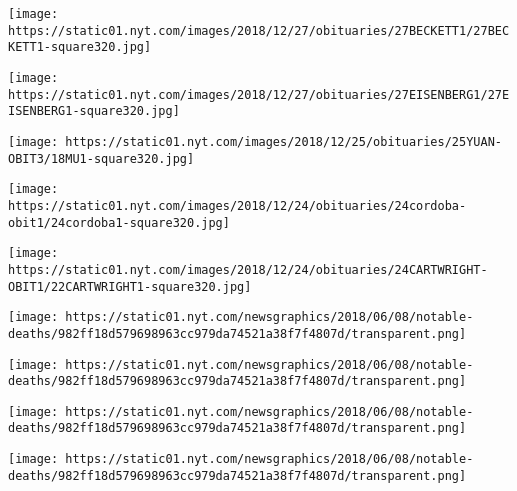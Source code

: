 \href{https://www.nytimes.com/2018/12/26/obituaries/sister-wendy-beckett-dead.html}{}

\texttt{[image: https://static01.nyt.com/images/2018/12/27/obituaries/27BECKETT1/27BECKETT1-square320.jpg]}

\href{https://www.nytimes.com/2018/12/26/obituaries/larry-eisenberg-dead.html}{}

\texttt{[image: https://static01.nyt.com/images/2018/12/27/obituaries/27EISENBERG1/27EISENBERG1-square320.jpg]}

\href{https://www.nytimes.com/2018/12/24/obituaries/yuan-mu-dead.html}{}

\texttt{[image: https://static01.nyt.com/images/2018/12/25/obituaries/25YUAN-OBIT3/18MU1-square320.jpg]}

\href{https://www.nytimes.com/2018/12/23/obituaries/roberto-suazo-cordova-dies-at-91.html}{}

\texttt{[image: https://static01.nyt.com/images/2018/12/24/obituaries/24cordoba-obit1/24cordoba1-square320.jpg]}

\href{https://www.nytimes.com/2018/12/23/obituaries/justin-cartwright-dies-at-75.html}{}

\texttt{[image: https://static01.nyt.com/images/2018/12/24/obituaries/24CARTWRIGHT-OBIT1/22CARTWRIGHT1-square320.jpg]}

\href{https://www.nytimes.com/2018/12/22/obituaries/audrey-geisel-dead.html}{}

\texttt{[image: https://static01.nyt.com/newsgraphics/2018/06/08/notable-deaths/982ff18d579698963cc979da74521a38f7f4807d/transparent.png]}

\href{https://www.nytimes.com/2018/12/21/obituaries/mel-hutchins-dead.html}{}

\texttt{[image: https://static01.nyt.com/newsgraphics/2018/06/08/notable-deaths/982ff18d579698963cc979da74521a38f7f4807d/transparent.png]}

\href{https://www.nytimes.com/2018/12/20/obituaries/raven-wilkinson-dead.html}{}

\texttt{[image: https://static01.nyt.com/newsgraphics/2018/06/08/notable-deaths/982ff18d579698963cc979da74521a38f7f4807d/transparent.png]}

\href{https://www.nytimes.com/2018/12/20/obituaries/donald-moffat-dead.html}{}

\texttt{[image: https://static01.nyt.com/newsgraphics/2018/06/08/notable-deaths/982ff18d579698963cc979da74521a38f7f4807d/transparent.png]}

\href{https://www.nytimes.com/2018/12/19/obituaries/john-ford-noonan-dead.html}{}

